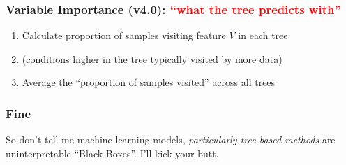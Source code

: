 \documentclass[xcolor={dvipsnames}]{beamer}
\begin{document}
\frame
{
\frametitle{Variable Importance (v4.0): \textcolor{red}{``what the tree predicts with''}}

\begin{enumerate}
\item<1-> Calculate proportion of samples visiting feature $V$ in each tree
\item<2->[] (conditions higher in the tree typically visited by more data) 
\item<3-> Average the ``proportion of samples visited''  across all trees

\vspace{2.45in}
\end{enumerate}

}



\frame
{
\frametitle{Fine}


So don't tell me machine learning models, \emph{particularly tree-based methods} are uninterpretable ``Black-Boxes''. I'll kick your butt.\\${}$\\${}$\\${}$\\${}$\\

}
\end{document}
